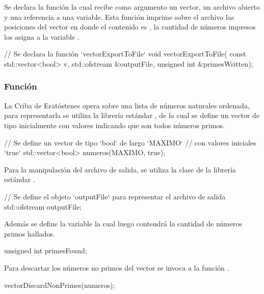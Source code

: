 \documentclass[12pt]{article}
\newenvironment{fullgrayverb}
{\verbbox}
{\endverbbox\par\colorbox{gray!25}{\parbox{\textwidth}{\theverbbox}}\par}
\begin{document}
Se declara la función  la cual recibe como
argumento un vector, un archivo abierto y una referencia a una variable. Esta
función imprime sobre el archivo las posiciones del vector en donde el
contenido es , la cantidad de números impresos los asigna a la
variable .

\begin{fullgrayverb}[\mbox{}]
// Se declara la función `vectorExportToFile`
void vectorExportToFile(
         const std::vector<bool> v,
         std::ofstream &outputFile,
         unsigned int &primesWritten);
\end{fullgrayverb}

\subsubsection{Función }

La Criba de Eratóstenes opera sobre una lista de números naturales ordenada,
para representarla se utiliza la librería estándar , de la cual
se define un vector de tipo  inicialmente con valores 
indicando que son todos números primos.

\begin{fullgrayverb}[\mbox{}]
// Se define un vector de tipo `bool` de largo `MAXIMO`
// con valores iniciales `true`
std::vector<bool> numeros(MAXIMO, true);
\end{fullgrayverb}

\pagebreak
Para la manipulación del archivo de salida, se utiliza la clase 
de la librería estándar .

\begin{fullgrayverb}[\mbox{}]
// Se define el objeto `outputFile` para representar el archivo de salida
std::ofstream outputFile;
\end{fullgrayverb}

Además se define la variable  la cual luego contendrá la
cantidad de números primos hallados.

\begin{fullgrayverb}[\mbox{}]
unsigned int primesFound;
\end{fullgrayverb}

Para descartar los números no primos del vector  se invoca a la
función \linebreak{}.

\begin{fullgrayverb}[\mbox{}]
vectorDiscardNonPrimes(numeros);
\end{fullgrayverb}
\end{document}
